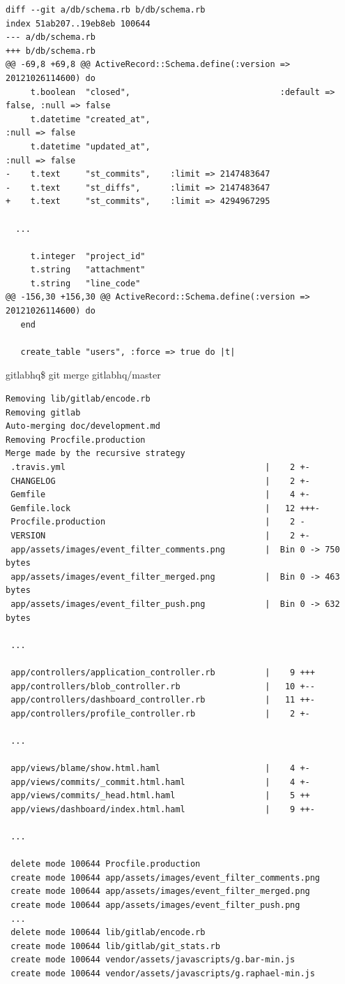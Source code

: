 \documentclass[times, utf8, seminar]{fit}
\begin{document}
\begin{lstlisting}
diff --git a/db/schema.rb b/db/schema.rb
index 51ab207..19eb8eb 100644
--- a/db/schema.rb
+++ b/db/schema.rb
@@ -69,8 +69,8 @@ ActiveRecord::Schema.define(:version => 20121026114600) do
     t.boolean  "closed",                              :default => false, :null => false
     t.datetime "created_at",                                             :null => false
     t.datetime "updated_at",                                             :null => false
-    t.text     "st_commits",    :limit => 2147483647
-    t.text     "st_diffs",      :limit => 2147483647
+    t.text     "st_commits",    :limit => 4294967295

  ...

     t.integer  "project_id"
     t.string   "attachment"
     t.string   "line_code"
@@ -156,30 +156,30 @@ ActiveRecord::Schema.define(:version => 20121026114600) do
   end
 
   create_table "users", :force => true do |t|
\end{lstlisting}


gitlabhq\$ git merge gitlabhq/master

\begin{lstlisting}
Removing lib/gitlab/encode.rb
Removing gitlab
Auto-merging doc/development.md
Removing Procfile.production
Merge made by the recursive strategy
 .travis.yml                                        |    2 +-
 CHANGELOG                                          |    2 +-
 Gemfile                                            |    4 +-
 Gemfile.lock                                       |   12 +++-
 Procfile.production                                |    2 -
 VERSION                                            |    2 +-
 app/assets/images/event_filter_comments.png        |  Bin 0 -> 750 bytes
 app/assets/images/event_filter_merged.png          |  Bin 0 -> 463 bytes
 app/assets/images/event_filter_push.png            |  Bin 0 -> 632 bytes
 
 ...

 app/controllers/application_controller.rb          |    9 +++
 app/controllers/blob_controller.rb                 |   10 +--
 app/controllers/dashboard_controller.rb            |   11 ++-
 app/controllers/profile_controller.rb              |    2 +-

 ...

 app/views/blame/show.html.haml                     |    4 +-
 app/views/commits/_commit.html.haml                |    4 +-
 app/views/commits/_head.html.haml                  |    5 ++
 app/views/dashboard/index.html.haml                |    9 ++-
 
 ... 
 
 delete mode 100644 Procfile.production
 create mode 100644 app/assets/images/event_filter_comments.png
 create mode 100644 app/assets/images/event_filter_merged.png
 create mode 100644 app/assets/images/event_filter_push.png
 ...
 delete mode 100644 lib/gitlab/encode.rb
 create mode 100644 lib/gitlab/git_stats.rb
 create mode 100644 vendor/assets/javascripts/g.bar-min.js
 create mode 100644 vendor/assets/javascripts/g.raphael-min.js
\end{lstlisting}
\end{document}
